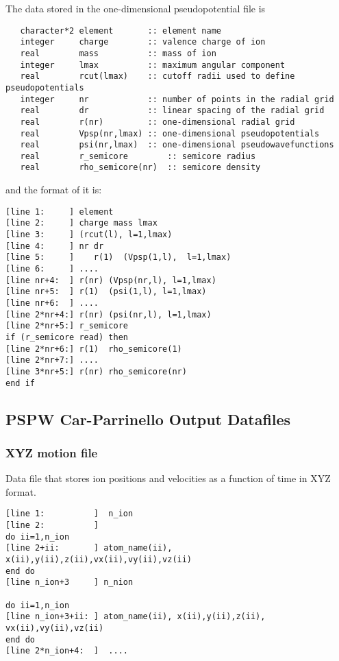 The data stored in the one-dimensional pseudopotential file is
\begin{verbatim}
   character*2 element       :: element name
   integer     charge        :: valence charge of ion
   real        mass          :: mass of ion
   integer     lmax          :: maximum angular component
   real        rcut(lmax)    :: cutoff radii used to define pseudopotentials
   integer     nr            :: number of points in the radial grid
   real        dr            :: linear spacing of the radial grid
   real        r(nr)         :: one-dimensional radial grid
   real        Vpsp(nr,lmax) :: one-dimensional pseudopotentials
   real        psi(nr,lmax)  :: one-dimensional pseudowavefunctions
   real        r_semicore        :: semicore radius
   real        rho_semicore(nr)  :: semicore density
\end{verbatim}
and the format of it is:
\begin{verbatim}
[line 1:     ] element  
[line 2:     ] charge mass lmax
[line 3:     ] (rcut(l), l=1,lmax)
[line 4:     ] nr dr
[line 5:     ]    r(1)  (Vpsp(1,l),  l=1,lmax)
[line 6:     ] ....
[line nr+4:  ] r(nr) (Vpsp(nr,l), l=1,lmax)
[line nr+5:  ] r(1)  (psi(1,l), l=1,lmax) 
[line nr+6:  ] ....
[line 2*nr+4:] r(nr) (psi(nr,l), l=1,lmax)
[line 2*nr+5:] r_semicore
if (r_semicore read) then
[line 2*nr+6:] r(1)  rho_semicore(1)
[line 2*nr+7:] ....
[line 3*nr+5:] r(nr) rho_semicore(nr)
end if
\end{verbatim}



\subsection{PSPW Car-Parrinello Output Datafiles}
\label{sec:pspw_cp_data}

\subsubsection{XYZ motion file}
Data file that stores ion positions and velocities as
a function of time in XYZ format.

\begin{verbatim}
[line 1:          ]  n_ion
[line 2:          ]  
do ii=1,n_ion
[line 2+ii:       ] atom_name(ii), x(ii),y(ii),z(ii),vx(ii),vy(ii),vz(ii)
end do
[line n_ion+3     ] n_nion

do ii=1,n_ion
[line n_ion+3+ii: ] atom_name(ii), x(ii),y(ii),z(ii), vx(ii),vy(ii),vz(ii)
end do
[line 2*n_ion+4:  ]  ....
\end{verbatim}


